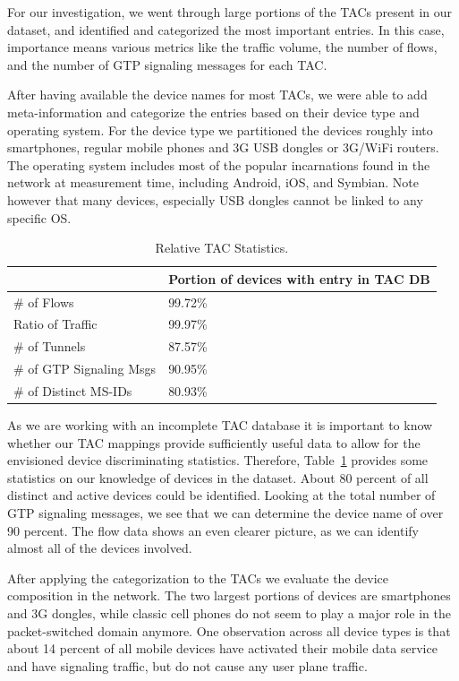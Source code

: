 For our investigation, we went through large portions of the \acp{TAC} present in our dataset, and identified and categorized the most important entries. In this case, importance means various metrics like the traffic volume, the number of flows, and the number of \ac{GTP} signaling messages for each \ac{TAC}. 

After having available the device names for most \acp{TAC}, we were able to add meta-information and categorize the entries based on their device type and operating system. For the device type we partitioned the devices roughly into smartphones, regular mobile phones and 3G USB dongles or 3G/WiFi routers. The operating system includes most of the popular incarnations found in the network at measurement time, including Android, iOS, and Symbian. Note however that many devices, especially USB dongles cannot be linked to any specific OS.

\begin{table}
\centering
\caption{Relative \acs{TAC} Statistics.}
\label{tab:tacstats}
\begin{tabular}{|p{4cm}|p{3cm}|} \hline
& \textbf{Portion of devices with entry in TAC DB}\\ \hline
\# of Flows & 99.72\% \\ \hline
Ratio of Traffic & 99.97\%\\ \hline
\# of Tunnels & 87.57\% \\ \hline
\# of GTP Signaling Msgs & 90.95\% \\ \hline
\# of Distinct \acp{MS-ID} & 80.93\%\\ \hline
\end{tabular}
\end{table}

As we are working with an incomplete \ac{TAC} database it is important to know whether our \ac{TAC} mappings provide sufficiently useful data to allow for the envisioned device discriminating statistics. Therefore, Table~\ref{tab:tacstats} provides some statistics on our knowledge of devices in the dataset. About 80 percent of all distinct and active devices could be identified. Looking at the total number of \ac{GTP} signaling messages, we see that we can determine the device name of over 90 percent. The flow data shows an even clearer picture, as we can identify almost all of the devices involved.

After applying the categorization to the \acp{TAC} we evaluate the device composition in the network. The two largest portions of devices are smartphones and 3G dongles, while classic cell phones do not seem to play a major role in the packet-switched domain anymore. One observation across all device types is that about 14 percent of all mobile devices have activated their mobile data service and have signaling traffic, but do not cause any user plane traffic.

